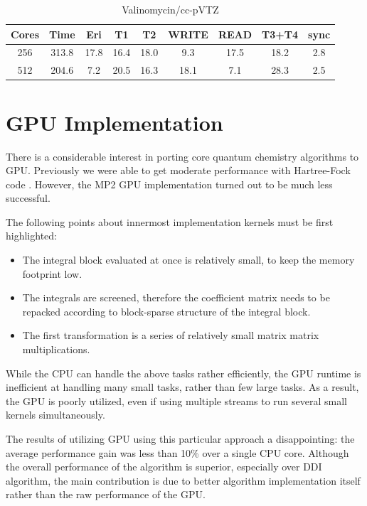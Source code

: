 \documentclass[12pt]{article} \usepackage[margin=1in]{geometry}
\begin{document}
\begin{table}
  \label{valinomycin}
  \caption{Valinomycin/cc-pVTZ}
  \begin{center}
    \begin{tabular}{| c | c | c | c | c | c | c | c | c |}
      \hline
      Cores & Time & Eri   & T1    & T2   & WRITE & READ & T3+T4 & sync \\ 
      \hline
      256 & 313.8 & 17.8  & 16.4  & 18.0 & 9.3  & 17.5 & 18.2  & 2.8 \\
      512 & 204.6 & 7.2   & 20.5  & 16.3 & 18.1 & 7.1  & 28.3  & 2.5  \\
      \hline
    \end{tabular}
  \end{center}
\end{table}


\section{GPU Implementation}
There is a considerable interest in porting core quantum chemistry
algorithms to GPU.  Previously we were able to get moderate
performance with Hartree-Fock code \cite {asadchev}.  However, the MP2
GPU implementation turned out to be much less successful.

The following points about innermost implementation kernels must be
first highlighted:
\begin {itemize}
\item The integral block evaluated at once is relatively small, to
  keep the memory footprint low.
\item The integrals are screened, therefore the coefficient matrix
  needs to be repacked according to block-sparse structure of the
  integral block.
\item The first transformation is a series of relatively
  small matrix matrix multiplications.
\end {itemize}

While the CPU can handle the above tasks rather efficiently, the GPU
runtime is inefficient at handling many small tasks, rather than few
large tasks.  As a result, the GPU is poorly utilized, even if
using multiple streams to run several small kernels simultaneously.

The results of utilizing GPU using this particular approach a
disappointing: the average performance gain was less than 10\% over a
single CPU core.  Although the overall performance of the algorithm is
superior, especially over DDI algorithm, the main contribution is due
to better algorithm implementation itself rather than the raw
performance of the GPU.
\end{document}
